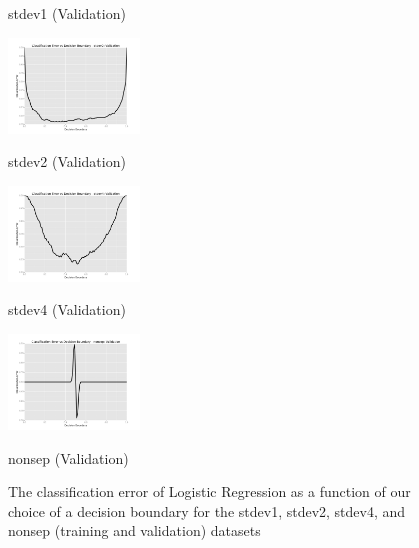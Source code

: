 \documentclass[10pt]{article}
\begin{document}
\begin{figure}[ht]
\begin{minipage}[b]{.24\linewidth}
		\caption*{stdev1 (Validation)}
	\end{minipage}
	\begin{minipage}[b]{.24\linewidth}
		\includegraphics[width=1\linewidth, height=1in]{CEDB_stdev2_validation.png}
		\caption*{stdev2 (Validation)}
	\end{minipage}
	\begin{minipage}[b]{.24\linewidth}
		\includegraphics[width=1\linewidth, height=1in]{CEDB_stdev4_validation.png}
		\caption*{stdev4 (Validation)}
	\end{minipage}
	\begin{minipage}[b]{.24\linewidth}
		\includegraphics[width=1\linewidth, height=1in]{CEDB_nonsep_validation.png}
		\caption*{nonsep (Validation)}
	\end{minipage}
	\caption{The classification error of Logistic Regression as a function of our choice of a decision boundary for the stdev1, stdev2, stdev4, and nonsep (training and validation) datasets}
\end{figure}
\end{document}
